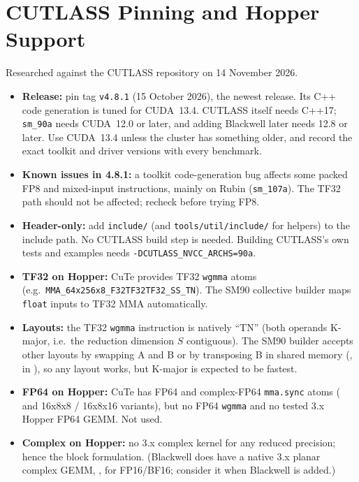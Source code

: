 \documentclass[10pt,letterpaper]{article}
\begin{document}
\section*{CUTLASS Pinning and Hopper Support}

Researched against the CUTLASS repository on 14 November 2026.

\begin{itemize}
  \item \textbf{Release:} pin tag \texttt{v4.8.1} (15 October 2026), the newest release. Its C++ code generation is tuned for CUDA~13.4. CUTLASS itself needs C++17; \texttt{sm\_90a} needs CUDA~12.0 or later, and adding Blackwell later needs 12.8 or later. Use CUDA~13.4 unless the cluster has something older, and record the exact toolkit and driver versions with every benchmark.
  \item \textbf{Known issues in 4.8.1:} a toolkit code-generation bug affects some packed FP8 and mixed-input instructions, mainly on Rubin (\texttt{sm\_107a}). The TF32 path should not be affected; recheck before trying FP8.
  \item \textbf{Header-only:} add \texttt{include/} (and \texttt{tools/util/include/} for helpers) to the include path. No CUTLASS build step is needed. Building CUTLASS's own tests and examples needs \texttt{-DCUTLASS\_NVCC\_ARCHS=90a}.
  \item \textbf{TF32 on Hopper:} CuTe provides TF32 \texttt{wgmma} atoms (e.g.\ \texttt{MMA\_64x256x8\_F32TF32TF32\_SS\_TN}). The SM90 collective builder maps \texttt{float} inputs to TF32 MMA automatically.
  \item \textbf{Layouts:} the TF32 \texttt{wgmma} instruction is natively ``TN'' (both operands K-major, i.e.\ the reduction dimension $S$ contiguous). The SM90 builder accepts other layouts by swapping A and B or by transposing B in shared memory (,  in ), so any layout works, but K-major is expected to be fastest.
  \item \textbf{FP64 on Hopper:} CuTe has FP64 and complex-FP64 \texttt{mma.sync} atoms ( and 16x8x8 / 16x8x16 variants), but no FP64 \texttt{wgmma} and no tested 3.x Hopper FP64 GEMM. Not used.
  \item \textbf{Complex on Hopper:} no 3.x complex kernel for any reduced precision; hence the block formulation. (Blackwell does have a native 3.x planar complex GEMM, , for FP16/BF16; consider it when Blackwell is added.)
\end{itemize}
\end{document}
